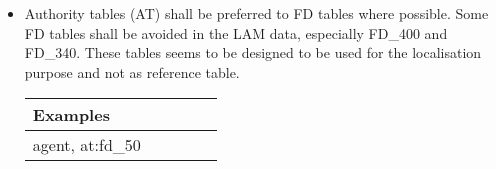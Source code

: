 \begin{itemize}



    \item

    Authority tables (AT) shall be preferred to FD tables where possible. Some FD tables shall be avoided in the LAM data, especially FD\_400 and FD\_340. These tables seems to be designed to be used for the localisation purpose and not as reference table.

    \begin{tabular}{|p{0.4\linewidth}|}
        \hline
        \textbf{Examples} \\ \hline
        agent,
    at:fd\_50      \\ \hline
    \end{tabular}
    \\
\end{itemize}
